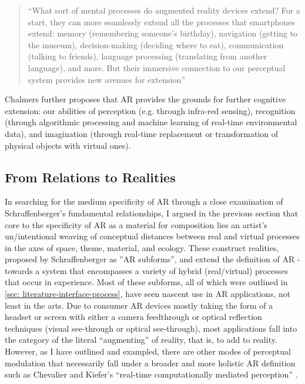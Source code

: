 \begin{quote}
    “What sort of mental processes do augmented reality devices extend? For a start, they can more seamlessly extend all the processes that smartphones extend: memory (remembering someone’s birthday), navigation (getting to the museum), decision-making (deciding where to eat), communication (talking to friends), language processing (translating from another language), and more. But their immersive connection to our perceptual system provides new avenues for extension” \citep[p. 299]{chalmers2022}
\end{quote}
Chalmers further proposes that AR provides the grounds for further cognitive extension: our abilities of perception (e.g. through infra-red sensing), recognition (through algorithmic processing and machine learning of real-time environmental data), and imagination (through real-time replacement or transformation of physical objects with virtual ones).

\subsection{From Relations to Realities}\label{sec: theory-embodiment-realities}
In searching for the medium specificity of AR through a close examination of Schraffenberger’s fundamental relationships, I argued in the previous section that core to the specificity of AR as a material for composition lies an artist’s un/intentional weaving of conceptual distances between real and virtual processes in the axes of space, theme, material, and ecology. These construct realities, proposed by Schraffenberger as ”AR subforms”, and extend the definition of AR - towards a system that encompasses a variety of hybrid (real/virtual) processes that occur in experience. Most of these subforms, all of which were outlined in \autoref{sec: literature-interface-process}, have seen nascent use in AR applications, not least in the arts. Due to consumer AR devices mostly taking the form of a headset or screen with either a camera feedthrough or optical reflection techniques (visual see-through or optical see-through), most applications fall into the category of the literal “augmenting” of reality, that is, to add to reality. However, as I have outlined and exampled, there are other modes of perceptual modulation that necessarily fall under a broader and more holistic AR definition such as Chevalier and Kiefer’s “real-time computationally mediated perception” \citeyearpar[]{chevalier2020}.

